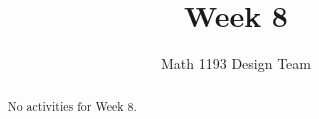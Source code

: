 \documentclass[noauthor,noinstructornotes]{ximera}
\title{Week 8}
\author{Math 1193 Design Team}
\begin{document}
\begin{abstract}
    No activities for Week 8.
\end{abstract}
\maketitle







\end{document}
